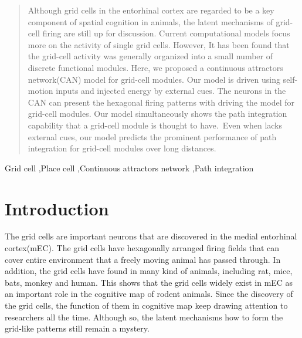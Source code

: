 \documentclass[preprint,12pt]{elsarticle}
\begin{document}
\begin{frontmatter}
\begin{abstract}
Although grid cells in the entorhinal cortex are regarded to be a key component of spatial cognition in animals, the latent mechanisms of grid-cell firing are still up for discussion. Current computational models focus more on the activity of single grid cells. However, It has been found that the grid-cell activity was generally organized into a small number of discrete functional modules\cite{Stensola2012}. Here, we proposed a continuous attractors network(CAN) model for grid-cell modules. Our model is driven using self-motion inputs and injected energy by external cues. The neurons in the CAN can present the hexagonal firing patterns with driving the model for grid-cell modules. Our model simultaneously shows the path integration capability that a grid-cell module is thought to have. Even when lacks external cues, our model predicts the prominent performance of path integration for grid-cell modules over long distances.

\end{abstract}



\begin{keyword}
Grid cell \sep Place cell  \sep Continuous attractors network \sep Path integration
\end{keyword}

\end{frontmatter}


\section{Introduction}
The grid cells are important neurons that are discovered in the medial entorhinal cortex(mEC)\cite{Moser2017}. The grid cells have hexagonally arranged firing fields that can cover entire environment that a freely moving animal has passed through\cite{Rowland2016}. In addition, the grid cells have found in many kind of animals, including rat, mice\cite{Fyhn2008}, bats\cite{Yartsev2011}, monkey\cite{Killian2012} and human\cite{Jacobs2013,Kunz2015,Doeller2010}. This shows that the grid cells widely exist in mEC as an important role in the cognitive map of rodent animals. Since the discovery of the grid cells, the function of them in cognitive map keep drawing attention to researchers all the time. Although so, the latent mechanisms how to form the grid-like patterns still remain a mystery\cite{DAlbis2017}.
\end{document}

